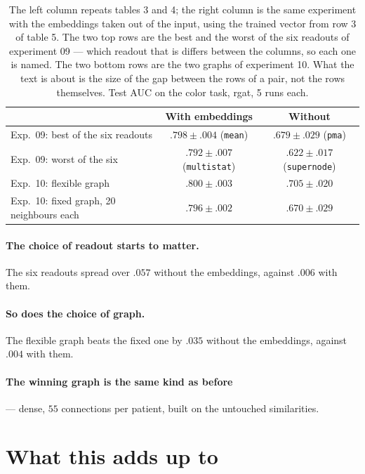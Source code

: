 \documentclass[11pt]{article}
\begin{document}
\begin{table}[h]
\centering
\begin{tabularx}{\textwidth}{Xcc}
\toprule
 & With embeddings & Without \\
\midrule
Exp.\ 09: best of the six readouts & $.798 \pm .004$ (\texttt{mean}) & $.679 \pm .029$ (\texttt{pma}) \\
Exp.\ 09: worst of the six & $.792 \pm .007$ (\texttt{multistat}) & $.622 \pm .017$ (\texttt{supernode}) \\
\addlinespace
Exp.\ 10: flexible graph & $.800 \pm .003$ & $.705 \pm .020$ \\
Exp.\ 10: fixed graph, 20 neighbours each & $.796 \pm .002$ & $.670 \pm .029$ \\
\bottomrule
\end{tabularx}
\caption{The left column repeats tables 3 and 4; the right column is the same experiment with
the embeddings taken out of the input, using the trained vector from row 3 of table 5. The two
top rows are the best and the worst of the six readouts of experiment 09 --- which readout that
is differs between the columns, so each one is named. The two bottom rows are the two graphs of
experiment 10. What the text is about is the size of the gap between the rows of a pair, not the
rows themselves. Test AUC on the color task, rgat, 5 runs each.}
\end{table}

\paragraph{The choice of readout starts to matter.} The six readouts spread over $.057$ without
the embeddings, against $.006$ with them.

\paragraph{So does the choice of graph.} The flexible graph beats the fixed one by $.035$
without the embeddings, against $.004$ with them.

\paragraph{The winning graph is the same kind as before} --- dense, $55$ connections per
patient, built on the untouched similarities.

\section*{What this adds up to}
\end{document}
